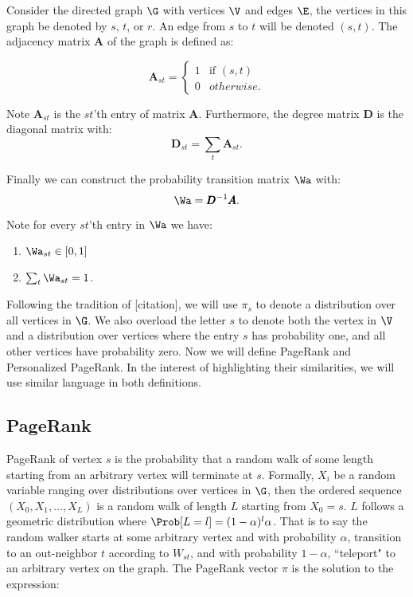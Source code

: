 Consider the directed graph $\G$ with vertices $\V$ and edges $\E$, the vertices in this graph be denoted by $s$, $t$, or $r$. An edge from $s$ to $t$ will be denoted $(s,t)$. The adjacency matrix $\pmb{A}$ of the graph is defined as:

\[   
\pmb{A}_{st} = \left\{
\begin{array}{ll}
      1 & \text{if } (s,t) \\
      0 & otherwise.
\end{array} 
\right. 
\]

Note $\pmb{A}_{st}$ is the $st$'th entry of matrix $\pmb{A}$. Furthermore, the degree matrix $\pmb{D}$ is the diagonal matrix with:
	\[
		\pmb{D}_{st} = \sum_{t} \pmb{A}_{st}.
	\]


Finally we can construct the probability transition matrix $\Wa$ with:
	\[
		\Wa = \pmb{D}^{-1} \pmb{A}.
	\]

Note for every $st$'th entry in $\Wa$ we have:

\begin{enumerate}
	\item $\Wa_{st} \in [0,1]$
	\item $\sum_t \Wa_{st} = 1$.
\end{enumerate}

Following the tradition of [citation], we will use $\pi_s$ to denote a distribution over all vertices in $\G$. We also overload the letter $s$ to denote both the vertex in $\V$ and a distribution over vertices where the entry $s$ has probability one, and all other vertices have probability zero. Now we will define PageRank and Personalized PageRank. In the interest of highlighting their similarities, we will use similar language in both definitions. 

\subsection{PageRank}

PageRank of vertex $s$ is the probability that a random walk of some length starting from an arbitrary vertex will terminate at $s$. Formally, $X_i$ be a random variable ranging over distributions over vertices in $\G$, then the ordered sequence $(X_0, X_1,\ldots,X_L)$ is a random walk of length $L$ starting from $X_0 = s$. $L$ follows a geometric distribution where $\Prob[L = l] = (1 - \alpha)^l \alpha$. That is to say the random walker starts at some arbitrary vertex and with probability $\alpha$, transition to an out-neighbor $t$ according to $W_{st}$, and with probability $1 - \alpha$, ``teleport" to an arbitrary vertex on the graph. The PageRank vector $\pi$ is the solution to the expression:

